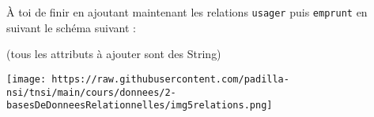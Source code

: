 \documentclass[a4paper,17pt]{extarticle}
\makeatletter
\let\origfigure\figure
\let\endorigfigure\endfigure
\renewenvironment{figure}[1][2] {
    \expandafter\origfigure\expandafter[H]
} {
    \endorigfigure
}
\newcommand{\boxspacing}{\kern\kvtcb@left@rule\kern\kvtcb@boxsep}
\newcommand{\prompt}[4]{
        \ttfamily\llap{{\color{#2}[#3]:\hspace{3pt}#4}}\vspace{-\baselineskip}
    }
\makeatother
\begin{document}
    À toi de finir en ajoutant maintenant les relations \texttt{usager} puis
\texttt{emprunt} en suivant le schéma suivant :

(tous les attributs à ajouter sont des String)

    \begin{figure}
\centering
\texttt{[image: https://raw.githubusercontent.com/padilla-nsi/tnsi/main/cours/donnees/2-basesDeDonneesRelationnelles/img5relations.png]}
\caption{Schéma des 5 relations}
\end{figure}

        {\scriptsize
    \begin{tcolorbox}[breakable, size=fbox, boxrule=1pt, pad at break*=1mm,colback=cellbackground, colframe=cellborder]
\prompt{In}{incolor}{ }{\boxspacing}
\begin{Verbatim}[commandchars=\\\{\}]

\end{Verbatim}
\end{tcolorbox}
    }


    
    
    
\end{document}
